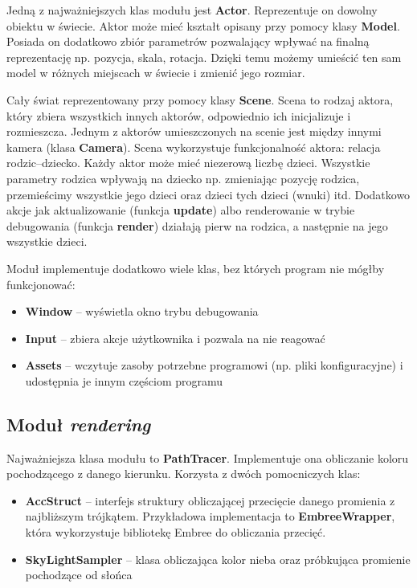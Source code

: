 \documentclass[inz,longabstract]{iithesis}
\begin{document}
            Jedną z najważniejszych klas modułu jest \textbf{Actor}. Reprezentuje on dowolny obiektu w świecie. Aktor może mieć kształt opisany przy pomocy klasy \textbf{Model}. Posiada on dodatkowo zbiór parametrów pozwalający wpływać na finalną reprezentację np. pozycja, skala, rotacja. Dzięki temu możemy umieścić ten sam model w różnych miejscach w świecie i zmienić jego rozmiar.
            
            Cały świat reprezentowany przy pomocy klasy \textbf{Scene}. Scena to rodzaj aktora, który zbiera wszystkich innych aktorów, odpowiednio ich inicjalizuje i rozmieszcza. Jednym z aktorów umieszczonych na scenie jest między innymi kamera (klasa \textbf{Camera}). Scena wykorzystuje funkcjonalność aktora: relacja rodzic--dziecko. Każdy aktor może mieć niezerową liczbę dzieci. Wszystkie parametry rodzica wpływają na dziecko np. zmieniając pozycję rodzica, przemieścimy wszystkie jego dzieci oraz dzieci tych dzieci (wnuki) itd. Dodatkowo akcje jak aktualizowanie (funkcja \textbf{update}) albo renderowanie w trybie debugowania (funkcja \textbf{render}) działają pierw na rodzica, a następnie na jego wszystkie dzieci.
            
            Moduł implementuje dodatkowo wiele klas, bez których program nie mógłby funkcjonować:
            \begin{itemize}
                \item \textbf{Window} -- wyświetla okno trybu debugowania
                \item \textbf{Input} -- zbiera akcje użytkownika i pozwala na nie reagować
                \item \textbf{Assets} -- wczytuje zasoby potrzebne programowi (np. pliki konfiguracyjne) i udostępnia je innym częściom programu 
            \end{itemize}
            
        \subsection{Moduł \textit{rendering}}
            Najważniejsza klasa modułu to \textbf{PathTracer}. Implementuje ona obliczanie koloru pochodzącego z danego kierunku. Korzysta z dwóch pomocniczych klas:
            \begin{itemize}
                \item \textbf{AccStruct} -- interfejs struktury obliczającej przecięcie danego promienia z najbliższym trójkątem. Przykładowa implementacja to \textbf{EmbreeWrapper}, która wykorzystuje bibliotekę Embree do obliczania przecięć. 
                \item \textbf{SkyLightSampler} -- klasa obliczająca kolor nieba oraz próbkująca promienie pochodzące od słońca
            \end{itemize}
            
\end{document}
